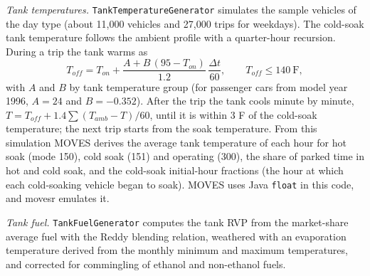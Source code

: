 \documentclass[preprint,
3p]{elsarticle} %
\begin{document}
\emph{Tank temperatures.} \texttt{TankTemperatureGenerator} simulates
the sample vehicles of the day type (about 11,000 vehicles and 27,000
trips for weekdays). The cold-soak tank temperature follows the ambient
profile with a quarter-hour recursion. During a trip the tank warms as
\begin{equation}
T_{off} = T_{on} + \frac{A + B\,(95 - T_{on})}{1.2}\,\frac{\Delta t}{60}, \qquad T_{off} \le 140\ \mathrm{F},
\end{equation} with \(A\) and \(B\) by tank temperature group (for
passenger cars from model year 1996, \(A = 24\) and \(B = -0.352\)).
After the trip the tank cools minute by minute,
\(T = T_{off} + 1.4 \sum (T_{amb} - T)/60\), until it is within 3 F of
the cold-soak temperature; the next trip starts from the soak
temperature. From this simulation MOVES derives the average tank
temperature of each hour for hot soak (mode 150), cold soak (151) and
operating (300), the share of parked time in hot and cold soak, and the
cold-soak initial-hour fractions (the hour at which each cold-soaking
vehicle began to soak). MOVES uses Java \texttt{float} in this code, and
movesr emulates it.

\emph{Tank fuel.} \texttt{TankFuelGenerator} computes the tank RVP from
the market-share average fuel with the Reddy blending relation,
weathered with an evaporation temperature derived from the monthly
minimum and maximum temperatures, and corrected for commingling of
ethanol and non-ethanol fuels.
\end{document}
